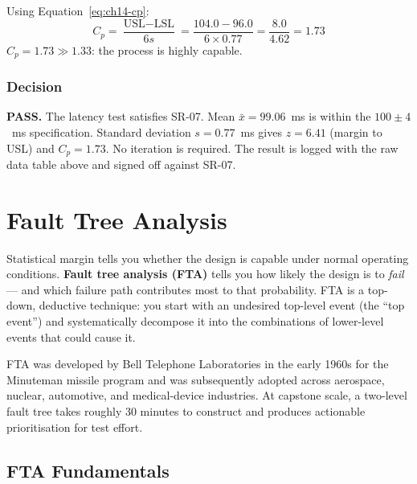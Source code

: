 Using Equation~\ref{eq:ch14-cp}:
\[
  C_p = \frac{\text{USL} - \text{LSL}}{6s} = \frac{104.0 - 96.0}{6 \times 0.77}
       = \frac{8.0}{4.62} = 1.73
\]
$C_p = 1.73 \gg 1.33$: the process is highly capable.

\subsubsection{Decision}

\textbf{PASS.}
The latency test satisfies SR-07.
Mean $\bar{x} = 99.06$~ms is within the $100 \pm 4$~ms specification.
Standard deviation $s = 0.77$~ms gives $z = 6.41$ (margin to USL) and $C_p = 1.73$.
No iteration is required.
The result is logged with the raw data table above and signed off against SR-07.

\section{Fault Tree Analysis}
\label{sec:ch14-fta}

Statistical margin tells you whether the design is
capable under normal operating conditions.
\textbf{Fault tree analysis (FTA)} tells you how likely the design is to
\emph{fail} --- and which failure path contributes most to that probability.
FTA is a top-down, deductive technique: you start with an undesired top-level event (the
``top event'') and systematically decompose it into the combinations of lower-level events
that could cause it.

FTA was developed by Bell Telephone Laboratories in the early 1960s for the Minuteman
missile program and was subsequently adopted across aerospace, nuclear, automotive, and
medical-device industries.
At capstone scale, a two-level fault tree takes roughly 30 minutes to construct and
produces actionable prioritisation for test effort.

\subsection{FTA Fundamentals}
\label{subsec:ch14-fta-fundamentals}

